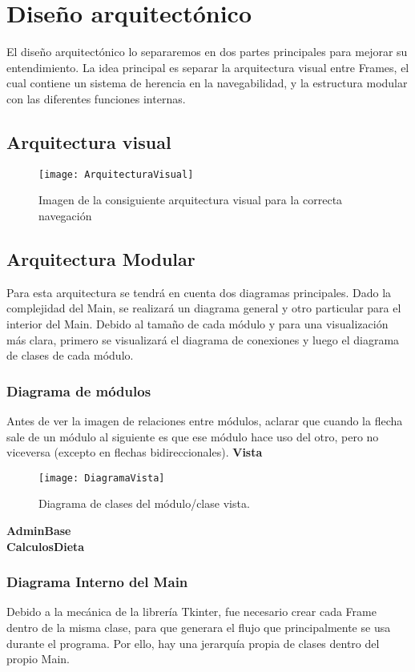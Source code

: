 \section{Diseño arquitectónico}
El diseño arquitectónico lo separaremos en dos partes principales para mejorar su entendimiento. La idea principal es separar la arquitectura visual entre Frames, el cual contiene un sistema de herencia en la navegabilidad, y la estructura modular con las diferentes funciones internas.
\pagebreak
\subsection{Arquitectura visual}
\begin{figure}[h]
\centering
\texttt{[image: ArquitecturaVisual]}
\caption{Imagen de la consiguiente arquitectura visual para la correcta navegación}
\label{figura:arquitecturaVisual}
\end{figure}
\subsection{Arquitectura Modular}
Para esta arquitectura se tendrá en cuenta dos diagramas principales. Dado la complejidad del Main, se realizará un diagrama general y otro particular para el interior del Main. Debido al tamaño de cada módulo y para una visualización más clara, primero se visualizará el diagrama de conexiones y luego el diagrama de clases de cada módulo.\\
\subsubsection{Diagrama de módulos}
Antes de ver la imagen de relaciones entre módulos, aclarar que cuando la flecha sale de un módulo al siguiente es que ese módulo hace uso del otro, pero no viceversa (excepto en flechas bidireccionales).
\pagebreak
\textbf{Vista}\\
\begin{figure}[h]
\centering
\texttt{[image: DiagramaVista]}
\caption{Diagrama de clases del módulo/clase vista.}
\label{figura:DiagramaVista}
\end{figure}
\pagebreak

\textbf{AdminBase}\\
\textbf{CalculosDieta}\\
\pagebreak
\subsubsection{Diagrama Interno del Main}
Debido a la mecánica de la librería Tkinter, fue necesario crear cada Frame dentro de la misma clase, para que generara el flujo que principalmente se usa durante el programa. Por ello, hay una jerarquía propia de clases dentro del propio Main.
